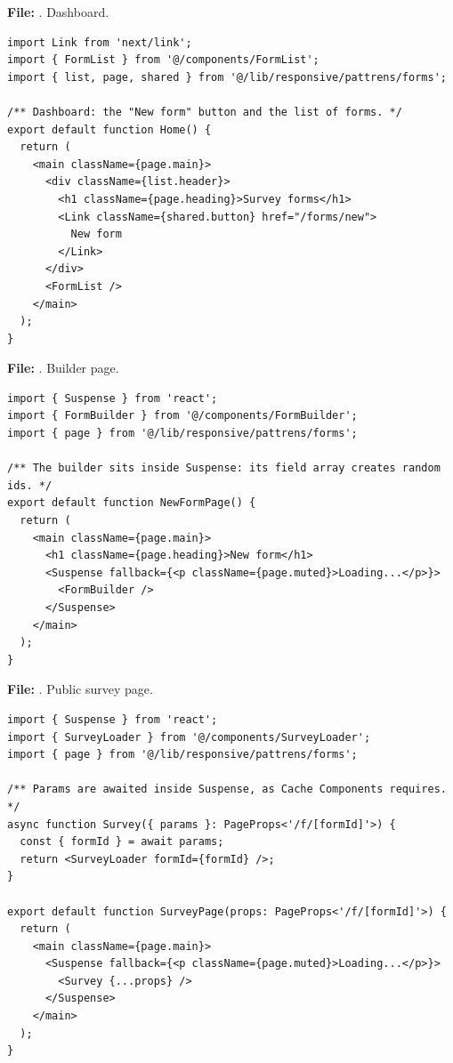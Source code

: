 \documentclass[11pt,a4paper]{article}
\begin{document}
\textbf{File:} . Dashboard.\par
\begin{lstlisting}
import Link from 'next/link';
import { FormList } from '@/components/FormList';
import { list, page, shared } from '@/lib/responsive/pattrens/forms';

/** Dashboard: the "New form" button and the list of forms. */
export default function Home() {
  return (
    <main className={page.main}>
      <div className={list.header}>
        <h1 className={page.heading}>Survey forms</h1>
        <Link className={shared.button} href="/forms/new">
          New form
        </Link>
      </div>
      <FormList />
    </main>
  );
}
\end{lstlisting}

\textbf{File:} . Builder page.\par
\begin{lstlisting}
import { Suspense } from 'react';
import { FormBuilder } from '@/components/FormBuilder';
import { page } from '@/lib/responsive/pattrens/forms';

/** The builder sits inside Suspense: its field array creates random ids. */
export default function NewFormPage() {
  return (
    <main className={page.main}>
      <h1 className={page.heading}>New form</h1>
      <Suspense fallback={<p className={page.muted}>Loading...</p>}>
        <FormBuilder />
      </Suspense>
    </main>
  );
}
\end{lstlisting}

\textbf{File:} . Public survey page.\par
\begin{lstlisting}
import { Suspense } from 'react';
import { SurveyLoader } from '@/components/SurveyLoader';
import { page } from '@/lib/responsive/pattrens/forms';

/** Params are awaited inside Suspense, as Cache Components requires. */
async function Survey({ params }: PageProps<'/f/[formId]'>) {
  const { formId } = await params;
  return <SurveyLoader formId={formId} />;
}

export default function SurveyPage(props: PageProps<'/f/[formId]'>) {
  return (
    <main className={page.main}>
      <Suspense fallback={<p className={page.muted}>Loading...</p>}>
        <Survey {...props} />
      </Suspense>
    </main>
  );
}
\end{lstlisting}
\end{document}
